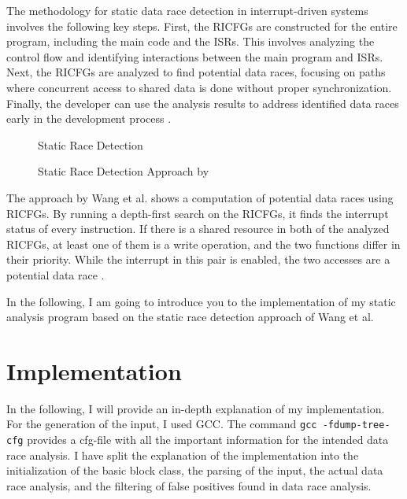 \documentclass[
fancyheadings, %
%
%
]{stsreprt}
\begin{document}
{		The methodology for static data race detection in interrupt-driven systems involves the following key steps. First, the \acp{RICFG} are constructed for the entire program, including the main code and the \acp{ISR}. This involves analyzing the control flow and identifying interactions between the main program and \acp{ISR}. Next, the \acp{RICFG} are analyzed to find potential data races, focusing on paths where concurrent access to shared data is done without proper synchronization. Finally, the developer can use the analysis results to address identified data races early in the development process \cite{wang2020}.
		
		
		\begin{figure}[H]
			\begin{algorithm}[H]
				\caption{Static Race Detection}
				
				\BlankLine
			\end{algorithm}
			\caption{Static Race Detection Approach by \cite{wang2020}}
		\end{figure}
		
		The approach by Wang et al. shows a computation of potential data races using \acp{RICFG}. By running a depth-first search on the \acp{RICFG}, it finds the interrupt status of every instruction. If there is a shared resource in both of the analyzed \acp{RICFG}, at least one of them is a write operation, and the two functions differ in their priority. While the interrupt in this pair is enabled, the two accesses are a potential data race \cite{wang2020}.
		
		In the following, I am going to introduce you to the implementation of my static analysis program based on the static race detection approach of Wang et al.



\chapter{Implementation}
In the following, I will provide an in-depth explanation of my implementation. For the generation of the input, I used \ac{GCC}. The command \texttt{gcc -fdump-tree-cfg} provides a cfg-file with all the important information for the intended data race analysis. I have split the explanation of the implementation into the initialization of the basic block class, the parsing of the input, the actual data race analysis, and the filtering of false positives found in data race analysis.


}
\end{document}
